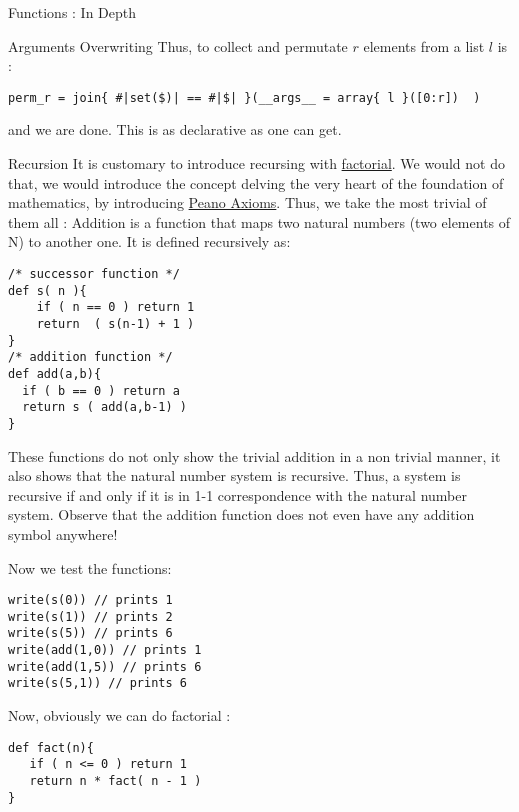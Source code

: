 \begin{section}{Functions : In Depth}
\begin{subsection}{Arguments Overwriting}
Thus, to collect and permutate $r$ elements from a list $l$ is :
 
\begin{lstlisting}[style=JexlStyle]
perm_r = join{ #|set($)| == #|$| }(__args__ = array{ l }([0:r])  )
\end{lstlisting}

and we are done. This is as declarative as one can get.

\end{subsection}

\begin{subsection}{Recursion}
It is customary to introduce recursing with \href{https://en.wikipedia.org/wiki/Factorial}{factorial}.
We would not do that, we would introduce the concept delving the very heart of the foundation of mathematics, 
by introducing \href{https://en.wikipedia.org/wiki/Peano_axioms}{Peano Axioms}.
Thus, we take the most trivial of them all : Addition is a function that maps two natural numbers (two elements of N) to another one. 
It is defined recursively as:

\begin{lstlisting}[style=JexlStyle]
/* successor function */
def s( n ){
    if ( n == 0 ) return 1 
    return  ( s(n-1) + 1 )  
}
/* addition function */
def add(a,b){
  if ( b == 0 ) return a
  return s ( add(a,b-1) )
}
\end{lstlisting}

These functions do not only show the trivial addition in a non trivial manner, 
it also shows that the natural number system is recursive.
Thus, a system is recursive if and only if it is in 1-1 correspondence with the natural number system.
Observe that the addition function does not even have any addition symbol anywhere!

Now we test the functions:

\begin{lstlisting}[style=JexlStyle]
write(s(0)) // prints 1 
write(s(1)) // prints 2
write(s(5)) // prints 6
write(add(1,0)) // prints 1
write(add(1,5)) // prints 6
write(s(5,1)) // prints 6
\end{lstlisting}

Now, obviously we can do factorial :
\begin{lstlisting}[style=JexlStyle]
def fact(n){
   if ( n <= 0 ) return 1 
   return n * fact( n - 1 )
}
\end{lstlisting}

\end{subsection}


\end{section}
